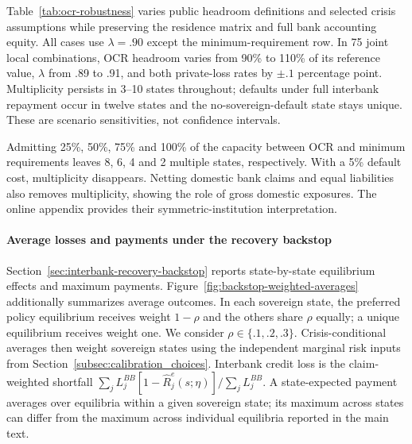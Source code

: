 Table~\ref{tab:ocr-robustness} varies public headroom definitions and selected crisis assumptions while preserving the residence matrix and full bank accounting equity. All cases use $\lambda=.90$ except the minimum-requirement row. In 75 joint local combinations, OCR headroom varies from 90\% to 110\% of its reference value, $\lambda$ from .89 to .91, and both private-loss rates by $\pm.1$ percentage point. Multiplicity persists in 3--10 states throughout; defaults under full interbank repayment occur in twelve states and the no-sovereign-default state stays unique. These are scenario sensitivities, not confidence intervals.

\begin{table}[htbp]
\centering
{}
\label{tab:ocr-robustness}
\small



\end{table}

Admitting 25\%, 50\%, 75\% and 100\% of the capacity between OCR and minimum requirements leaves 8, 6, 4 and 2 multiple states, respectively. With a 5\% default cost, multiplicity disappears. Netting domestic bank claims and equal liabilities also removes multiplicity, showing the role of gross domestic exposures. The online appendix provides their symmetric-institution interpretation.

\paragraph{Average losses and payments under the recovery backstop}
Section~\ref{sec:interbank-recovery-backstop} reports state-by-state equilibrium effects and maximum payments. Figure~\ref{fig:backstop-weighted-averages} additionally summarizes average outcomes. In each sovereign state, the preferred policy equilibrium receives weight $1-\rho$ and the others share $\rho$ equally; a unique equilibrium receives weight one. We consider $\rho\in\{.1,.2,.3\}$. Crisis-conditional averages then weight sovereign states using the independent marginal risk inputs from Section~\ref{subsec:calibration_choices}. Interbank credit loss is the claim-weighted shortfall $\sum_jL_j^{BB}[1-\widehat R_j^e(s;\eta)]/\sum_jL_j^{BB}$. A state-expected payment averages over equilibria within a given sovereign state; its maximum across states can differ from the maximum across individual equilibria reported in the main text.

